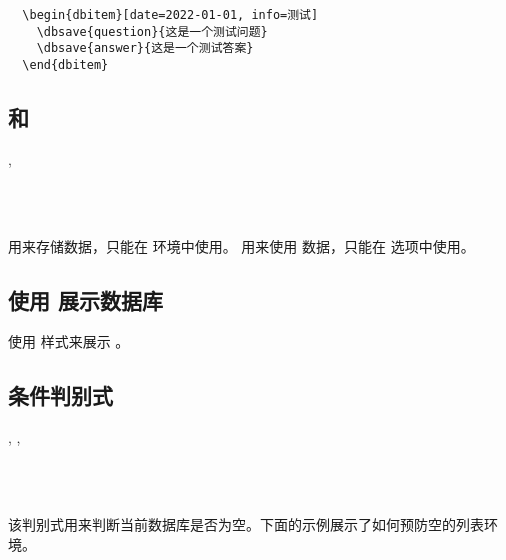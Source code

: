 \documentclass[full]{l3doc}
\begin{document}
\begin{documentation}
\begin{verbatim}
  \begin{dbitem}[date=2022-01-01, info=测试]
    \dbsave{question}{这是一个测试问题}
    \dbsave{answer}{这是一个测试答案}
  \end{dbitem}
\end{verbatim}

\subsection{ 和 }

\begin{function}{\dbsave, \dbuse}
  \begin{syntax}
       \\
       \\
  \end{syntax}

   用来存储数据，只能在  环境中使用。 用来使用
  数据，只能在  选项中使用。
\end{function}

\subsection{使用  展示数据库}

\begin{function}{\dbshow}
  \begin{syntax}
      
  \end{syntax}

  使用  样式来展示 。
\end{function}

\subsection{条件判别式}

\begin{function}{\dbIfEmptyT, \dbIfEmptyF, \dbIfEmptyTF}
  \begin{syntax}
       \\
      \\
     
  \end{syntax}

  该判别式用来判断当前数据库是否为空。下面的示例展示了如何预防空的列表环境。
\end{function}


\end{documentation}
\end{document}
